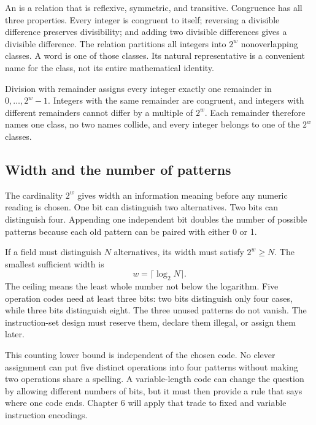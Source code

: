 An  is a relation that is reflexive, symmetric,
and transitive. Congruence has all three properties. Every integer is
congruent to itself; reversing a divisible difference preserves divisibility;
and adding two divisible differences gives a divisible difference. The
relation partitions all integers into \(2^w\) nonoverlapping classes. A word
is one of those classes. Its natural representative is a convenient name for
the class, not its entire mathematical identity.

\begin{proofkit}[title={\iconProofKit\ Why the quotient has exactly \(2^w\) words}]
Division with remainder assigns every integer exactly one remainder in
\(0,\ldots,2^w-1\). Integers with the same remainder are congruent, and
integers with different remainders cannot differ by a multiple of \(2^w\).
Each remainder therefore names one class, no two names collide, and every
integer belongs to one of the \(2^w\) classes.
\end{proofkit}

\subsection{Width and the number of patterns}

The cardinality \(2^w\) gives width an information meaning before any numeric
reading is chosen. One bit can distinguish two alternatives. Two bits can
distinguish four. Appending one independent bit doubles the number of possible
patterns because each old pattern can be paired with either 0 or 1.

If a field must distinguish \(N\) alternatives, its width must satisfy
\(2^w\geq N\). The smallest sufficient width is
\[
  w=\lceil\log_2 N\rceil.
\]
The ceiling means the least whole number not below the logarithm. Five
operation codes need at least three bits: two bits distinguish only four
cases, while three bits distinguish eight. The three unused patterns do not
vanish. The instruction-set design must reserve them, declare them illegal,
or assign them later.

This counting lower bound is independent of the chosen code. No clever
assignment can put five distinct operations into four patterns without making
two operations share a spelling. A variable-length code can change the
question by allowing different numbers of bits, but it must then provide a
rule that says where one code ends. Chapter 6 will apply that trade to fixed
and variable instruction encodings.

